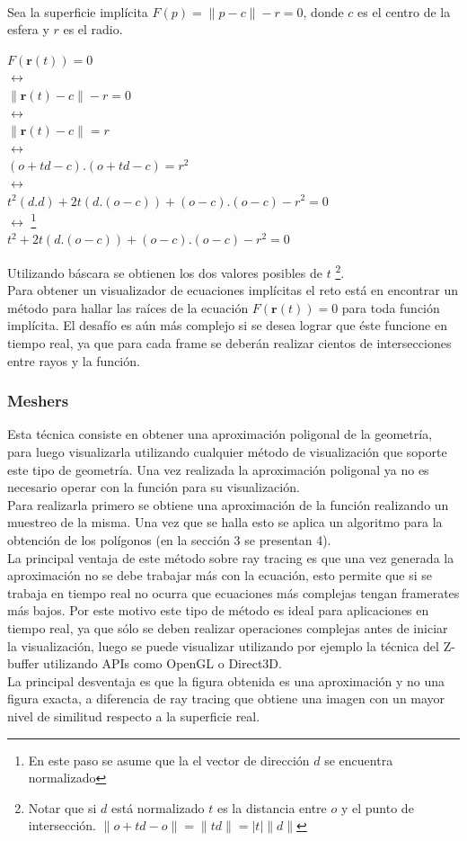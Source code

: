 \documentclass[12pt]{article}
\begin{document}
\\Sea la superficie implícita $F(p)=\lVert p -c \rVert - r = 0$, donde $c$ es el centro de la esfera y $r$ es el radio.
\begin{center}
$ F(\textbf{r}(t))= 0$
\\$ \leftrightarrow$
\\$ \lVert \textbf{r}(t) -c \rVert - r = 0$
\\$ \leftrightarrow$
\\$ \lVert \textbf{r}(t) -c \rVert = r$
\\ $\leftrightarrow$
\\ $(o+td -c).(o+td -c) = r^2 $ 
\\ $\leftrightarrow$
\\$t^2(d.d) + 2t(d.(o-c)) + (o-c).(o-c) - r^2=0$
\\ $\leftrightarrow$ \footnote{En este paso se asume que la el vector de dirección $d$ se encuentra normalizado}
\\$t^2 + 2t(d.(o-c)) + (o-c).(o-c) - r^2=0$
\end{center}
Utilizando báscara se obtienen los dos valores posibles de $t$ \footnote{Notar que si $d$ está normalizado $t$ es la distancia entre $o$ y el punto de intersección. $\lVert o + td - o \rVert = \lVert td\rVert = |t|\lVert d \rVert$}.
\\Para obtener un visualizador de ecuaciones implícitas el reto está en encontrar un método para hallar las raíces de la ecuación $F(\textbf{r}(t))=0$ para toda función implícita. El desafío es aún más complejo si se desea lograr que éste funcione en tiempo real, ya que para cada frame se deberán realizar cientos de intersecciones entre rayos y la función.  
\subsubsection{Meshers}
Esta técnica consiste en obtener una aproximación poligonal de la geometría, para luego visualizarla utilizando cualquier método de visualización que soporte este tipo de geometría. Una vez realizada la aproximación poligonal ya no es necesario operar con la función para su visualización.
\\Para realizarla primero se obtiene una aproximación de la función realizando un muestreo de la misma. Una vez que se halla esto se aplica un algoritmo para la obtención de los polígonos (en la sección 3 se presentan 4)\cite{mykola1}\cite{mykola2}.
\\La principal ventaja de este método sobre ray tracing es que una vez generada la aproximación no se debe trabajar más con la ecuación, esto permite que si se trabaja en tiempo real no ocurra que ecuaciones más complejas tengan framerates más bajos. Por este motivo este tipo de método es ideal para aplicaciones en tiempo real, ya que sólo se deben realizar operaciones complejas antes de iniciar la visualización, luego se puede visualizar utilizando por ejemplo la técnica del Z-buffer utilizando APIs como OpenGL o Direct3D.
\\La principal desventaja es que la figura obtenida es una aproximación y no una figura exacta, a diferencia de ray tracing que obtiene una imagen con un mayor nivel de similitud respecto a la superficie real\cite{realtimerendering}.
\end{document}

